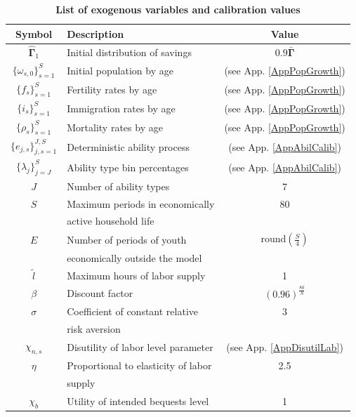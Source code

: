 \documentclass[letterpaper,12pt]{article}
\theoremstyle{definition}
\begin{document}
\begin{spacing}{1.5}
    \begin{table}[htbp] \centering \captionsetup{width=4.4in}
    \caption{\label{TabExogVars}\textbf{List of exogenous variables and calibration values}}
      \begin{threeparttable}
      \begin{tabular}{>{\small}c |>{\small}l |>{\small}c}
        \hline\hline
        Symbol & \quad\quad\quad\quad Description & Value \\
        \hline
        $\bm{\hat{\Gamma}}_1$ & Initial distribution of savings & $0.9\bm{\bar{\Gamma}}$ \\
        $\{\omega_{s,0}\}_{s=1}^S$ & Initial population by age & (see App. \ref{AppPopGrowth}) \\
        $\{f_s\}_{s=1}^S$ & Fertility rates by age & (see App. \ref{AppPopGrowth}) \\
        $\{i_s\}_{s=1}^S$ & Immigration rates by age & (see App. \ref{AppPopGrowth}) \\
        $\{\rho_s\}_{s=1}^S$ & Mortality rates by age & (see App. \ref{AppPopGrowth}) \\
        $\{e_{j,s}\}_{j,s=1}^{J,S}$ & Deterministic ability process & (see App. \ref{AppAbilCalib}) \\
        $\{\lambda_j\}_{j=J}^S$ & Ability type bin percentages & (see App. \ref{AppAbilCalib}) \\
        $J$ & Number of ability types & 7 \\
        $S$ & Maximum periods in economically & 80 \\
        &\quad active household life & \\
        $E$ & Number of periods of youth & $\text{round}\left(\frac{S}{4}\right)$ \\
        & \quad economically outside the model & \\
        $\tilde{l}$ & Maximum hours of labor supply & 1 \\
        $\beta$ & Discount factor & $(0.96)^\frac{80}{S}$ \\
        $\sigma$ & Coefficient of constant relative & 3 \\
        & \quad risk aversion & \\
        $\chi_{n,s}$ & Disutility of labor level parameter & (see App. \ref{AppDisutilLab}) \\
        $\eta$ & Proportional to elasticity of labor & 2.5 \\
        & \quad supply & \\
        $\chi_b$ & Utility of intended bequests level & 1 \\

\end{tabular}
\end{threeparttable}
\end{table}
\end{spacing}
\end{document}
